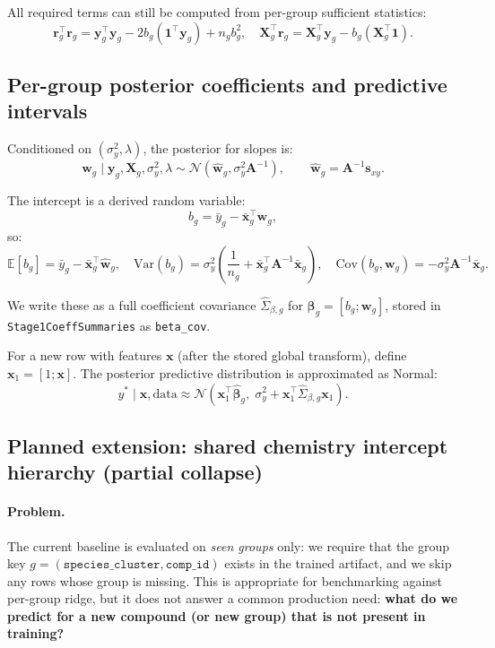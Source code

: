 \documentclass[11pt]{article}
\begin{document}
All required terms can still be computed from per-group sufficient statistics:
\[
  \bm{r}_g^\top \bm{r}_g = \bm{y}_g^\top \bm{y}_g - 2 b_g (\bm{1}^\top \bm{y}_g) + n_g b_g^2,\quad
  \bm{X}_g^\top \bm{r}_g = \bm{X}_g^\top \bm{y}_g - b_g (\bm{X}_g^\top \bm{1}).
\]

\subsection{Per-group posterior coefficients and predictive intervals}

Conditioned on $(\sigma_y^2, \lambda)$, the posterior for slopes is:
\[
  \bm{w}_g \mid \bm{y}_g, \bm{X}_g, \sigma_y^2, \lambda
  \sim \mathcal{N}\!\left(\hat{\bm{w}}_g, \sigma_y^2 \bm{A}^{-1}\right),
  \qquad
  \hat{\bm{w}}_g = \bm{A}^{-1}\bm{s}_{xy}.
\]

The intercept is a derived random variable:
\[
  b_g = \bar{y}_g - \bar{\bm{x}}_g^\top \bm{w}_g,
\]
so:
\[
  \mathbb{E}[b_g] = \bar{y}_g - \bar{\bm{x}}_g^\top \hat{\bm{w}}_g,
  \quad
  \mathrm{Var}(b_g) = \sigma_y^2\left(\frac{1}{n_g} + \bar{\bm{x}}_g^\top \bm{A}^{-1}\bar{\bm{x}}_g\right),
  \quad
  \mathrm{Cov}(b_g, \bm{w}_g) = -\sigma_y^2 \bm{A}^{-1}\bar{\bm{x}}_g.
\]

We write these as a full coefficient covariance $\widehat{\Sigma}_{\beta,g}$ for
$\bm{\beta}_g = [b_g; \bm{w}_g]$, stored in \texttt{Stage1CoeffSummaries} as \texttt{beta\_cov}.

For a new row with features $\bm{x}$ (after the stored global transform), define $\bm{x}_1 = [1; \bm{x}]$.
The posterior predictive distribution is approximated as Normal:
\[
  y^\ast \mid \bm{x}, \text{data} \approx \mathcal{N}\!\left(
    \bm{x}_1^\top \hat{\bm{\beta}}_g,\;
    \sigma_y^2 + \bm{x}_1^\top \widehat{\Sigma}_{\beta,g}\bm{x}_1
  \right).
\]

\subsection{Planned extension: shared chemistry intercept hierarchy (partial collapse)}

\paragraph{Problem.}
The current baseline is evaluated on \emph{seen groups} only: we require that the group key
$g = (\texttt{species\_cluster}, \texttt{comp\_id})$ exists in the trained artifact, and we skip any rows whose group is missing.
This is appropriate for benchmarking against per-group ridge, but it does not answer a common production need:
\textbf{what do we predict for a new compound (or new group) that is not present in training?}
\end{document}
